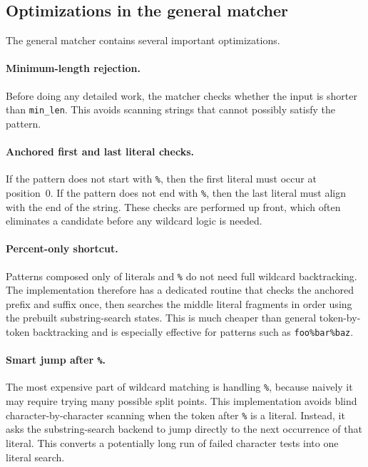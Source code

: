 \documentclass[11pt]{article}
\begin{document}
\subsection{Optimizations in the general matcher}

The general matcher contains several important optimizations.

\paragraph{Minimum-length rejection.}
Before doing any detailed work, the matcher checks whether the input is shorter than \texttt{min\_len}. This avoids scanning strings that cannot possibly satisfy the pattern.

\paragraph{Anchored first and last literal checks.}
If the pattern does not start with \texttt{\%}, then the first literal must occur at position~0. If the pattern does not end with \texttt{\%}, then the last literal must align with the end of the string. These checks are performed up front, which often eliminates a candidate before any wildcard logic is needed.

\paragraph{Percent-only shortcut.}
Patterns composed only of literals and \texttt{\%} do not need full wildcard backtracking. The implementation therefore has a dedicated routine that checks the anchored prefix and suffix once, then searches the middle literal fragments in order using the prebuilt substring-search states. This is much cheaper than general token-by-token backtracking and is especially effective for patterns such as \texttt{foo\%bar\%baz}.

\paragraph{Smart jump after \texttt{\%}.}
The most expensive part of wildcard matching is handling \texttt{\%}, because naively it may require trying many possible split points. This implementation avoids blind character-by-character scanning when the token after \texttt{\%} is a literal. Instead, it asks the substring-search backend to jump directly to the next occurrence of that literal. This converts a potentially long run of failed character tests into one literal search.
\end{document}
